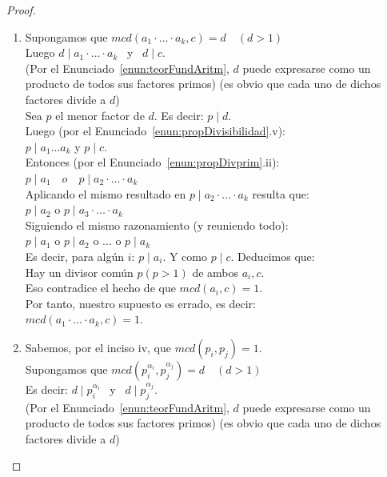 \begin{proof}
\begin{enumerate}[label=\roman*)]
Los únicos divisores (por definición de primo) de $p_{j}$ son: 1 y $p_{j}$.\\
Como $p_{i} \neq p_{j}$, entonces el común divisor más grande que tienen $p_{i}, p_{j}$ es 1.
\item Supongamos que $mcd(a_{1} \cdot \ldots \cdot a_{k}, c)=d \quad(d>1)$ \\
Luego $d \mid a_{1} \cdot \ldots \cdot a_{k}$ \, y \, $d \mid c$.\\
(Por el Enunciado~\ref{enun:teorFundAritm}, $d$ puede expresarse como un producto de todos sus factores primos) (es obvio que cada uno de dichos factores divide a $d$)\\
Sea $p$ el menor factor de $d$. Es decir: $p \mid d$.\\
Luego (por el Enunciado~\ref{enun:propDivisibilidad}.v):\\
$p \mid a_{1} \ldots  a_k$ y $p \mid c$.\\
Entonces (por el Enunciado~\ref{enun:propDivprim}.ii):\\
$p \mid a_{1} \quad o \quad p \mid  a_{2} \cdot \ldots \cdot a_{k}$\\
Aplicando el mismo resultado en $p \mid a_{2} \cdot \ldots \cdot a_{k}$ resulta que:\\
$p \mid a_{2}$ \quad o \quad $p \mid a_{3} \cdot \ldots \cdot a_{k}$\\
Siguiendo el mismo razonamiento (y reuniendo todo):\\
$p \mid a_{1}$ \; o \; $p \mid a_{2}$ \; o $\ldots$ o  \; $p \mid a_k$\\
Es decir, para algún $i$: $p \mid a_i$. Y como $p \mid c$. Deducimos que:\\
Hay un divisor común $p(p>1)$ de ambos $a_{i}, c$.\\
Eso contradice el hecho de que $mcd(a_{i}, c)=1$.\\
Por tanto, nuestro supuesto es errado, es decir:\\
$mcd(a_{1} \cdot \ldots \cdot a_{k}, c)=1$.
\item Sabemos, por el inciso iv, que $mcd(p_{i}, p_{j})=1$. \\
Supongamos que $mcd(p_{i}^{\alpha_{i}}, p_{j}^{\alpha_{j}})=d \quad(d>1)$\\
Es decir: $d \mid p_{i}^{\alpha_{i}}$ \, y \, $d \mid p_{j}^{\alpha_{j}}$.\\
(Por el Enunciado~\ref{enun:teorFundAritm}, $d$ puede expresarse como un producto de todos sus factores primos) (es obvio que cada uno de dichos factores divide a $d$)\\

\end{enumerate}
\end{proof}
